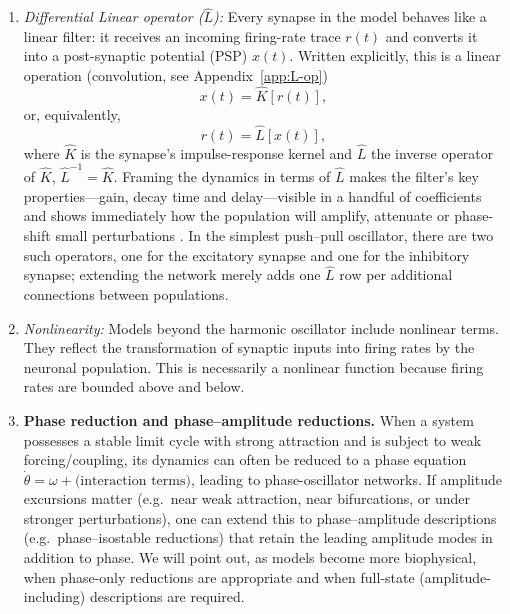 \documentclass[12pt]{article}
\numberwithin{equation}{section}
\newcommand{\rev}[1]{\begingroup\color{navyblue}#1\endgroup}
\begin{document}
\begin{enumerate}
\begin{enumerate}
\item \emph{Differential Linear operator (\(\hat L\)):} Every synapse in the model behaves like a linear filter: it receives an incoming firing-rate trace \(r(t)\) and converts it into a post-synaptic potential (PSP) \(x(t)\).  Written explicitly, this is a linear operation (convolution, see Appendix~\ref{app:L-op})
\begin{equation}
x(t)=\hat K[r(t)] ,
\end{equation}
or, equivalently,
\begin{equation}
r(t)=\hat L[x(t)] ,
\end{equation}
where \(\hat K\) is the synapse’s impulse-response kernel and \(\hat L\) the inverse operator of \(\hat K\), $\hat L^{-1} = \hat K $.  Framing the dynamics in terms of \(\hat L\) makes the filter’s key properties—gain, decay time and delay—visible in a handful of coefficients and shows immediately how the population will amplify, attenuate or phase-shift small perturbations \cite{strogatz2018nonlinear}.  In the simplest push–pull oscillator, there are two such operators, one for the excitatory synapse and one for the inhibitory synapse; extending the network merely adds one \(\hat L\) row per additional connections between populations.

\item \emph{Nonlinearity:} \rev{Models beyond the harmonic oscillator include nonlinear terms.} They reflect the transformation of synaptic inputs into firing rates by the neuronal population. This is necessarily a nonlinear function because firing rates are bounded above and below.

\item \rev{\textbf{Phase reduction and phase--amplitude reductions.}
When a system possesses a stable limit cycle with strong attraction and is subject to weak
forcing/coupling, its dynamics can often be reduced to a phase equation
$\dot{\theta}=\omega+\text{(interaction terms)}$, leading to phase-oscillator networks.
If amplitude excursions matter (e.g.\ near weak attraction, near bifurcations, or under
stronger perturbations), one can extend this to phase--amplitude descriptions (e.g.\
phase--isostable reductions) that retain the leading amplitude modes in addition to phase.
We will point out, as models become more biophysical, when phase-only reductions are
appropriate and when full-state (amplitude-including) descriptions are required.}

\end{enumerate}
\end{enumerate}
\end{document}
